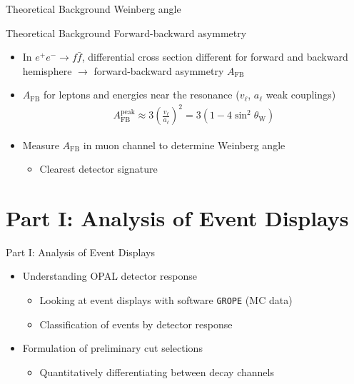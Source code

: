 \documentclass[11pt,xcolor=dvipsnames,professionalfonts]{beamer}
\begin{document}
\begin{frame}{Theoretical Background}
	Weinberg angle
\end{frame}

\begin{frame}{Theoretical Background}
	Forward-backward asymmetry
	\begin{itemize}
		\item In $e^+e^- \rightarrow f\bar{f}$, differential cross section different for forward and backward hemisphere $\rightarrow$ forward-backward asymmetry $A_\mathrm{FB}$
		\item $A_\mathrm{FB}$ for leptons and energies near the resonance ($v_\ell$, $a_\ell$ weak couplings)
		\begin{align*}
			A_\mathrm{FB}^{\mathrm{peak}}\approx 3\left(\frac{v_\ell}{a_\ell}\right)^2 = 3\left( 1 - 4 \sin^2\theta_\mathrm{W} \right)
		\end{align*}
		\item Measure $A_\mathrm{FB}$ in muon channel to determine Weinberg angle
		\begin{itemize}
			\item Clearest detector signature
		\end{itemize}
	\end{itemize}
\end{frame}

\section{Part I: Analysis of Event Displays}
\begin{frame}{Part I: Analysis of Event Displays}
	\begin{itemize}
		\setlength\itemsep{2.em}
		\item Understanding OPAL detector response
		\begin{itemize}
			\setlength\itemsep{0.5em}
			\item Looking at event displays with software \texttt{GROPE} (MC data)
			\item Classification of events by detector response
		\end{itemize}
		
		\item Formulation of preliminary cut selections
		\begin{itemize}
			\setlength\itemsep{0.5em}
			\item Quantitatively differentiating between decay channels
		\end{itemize}
	\end{itemize}
\end{frame}
\end{document}
